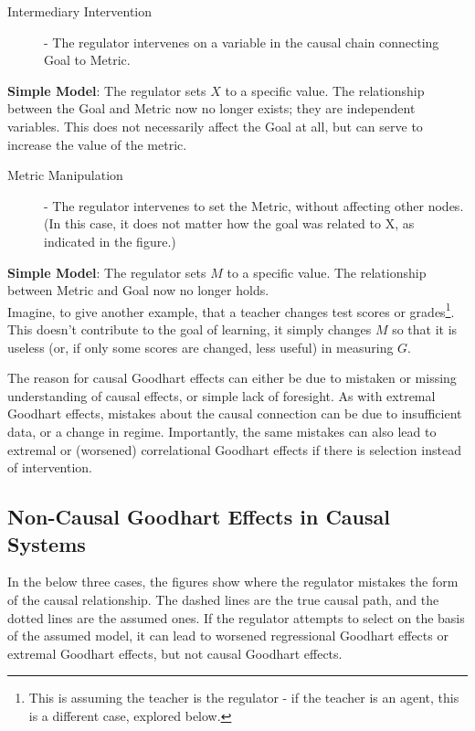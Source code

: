 \documentclass[10pt]{article}
\begin{document}
\begin{description}
\item[Intermediary Intervention] - The regulator intervenes on a variable in the causal chain connecting Goal to Metric.
\end{description}
\textbf{Simple Model}:  The regulator sets $X$ to a specific value. The relationship between the Goal and Metric now no longer exists; they are independent variables. This does not necessarily affect the Goal at all, but can serve to increase the value of the metric. 

\begin{description}
\item[Metric Manipulation] - The regulator intervenes to set the Metric, without affecting other nodes. (In this case, it does not matter how the goal was related to X, as indicated in the figure.)
\end{description}
\textbf{Simple Model}:  The regulator sets $M$ to a specific value. The relationship between Metric and Goal now no longer holds.\\

Imagine, to give another example, that a teacher changes test scores or grades\footnote{This is assuming the teacher is the regulator - if the teacher is an agent, this is a different case, explored below.}. This doesn't contribute to the goal of learning, it simply changes $M$ so that it is useless (or, if only some scores are changed, less useful) in measuring $G$. 

The reason for causal Goodhart effects can either be due to mistaken or missing understanding of causal effects, or simple lack of foresight. As with extremal Goodhart effects, mistakes about the causal connection can be due to insufficient data, or a change in regime. Importantly, the same mistakes can also lead to extremal or (worsened) correlational Goodhart effects if there is selection instead of intervention. 

\subsection*{Non-Causal Goodhart Effects in Causal Systems}

In the below three cases, the figures show where the regulator mistakes the form of the causal relationship. The dashed lines are the true causal path, and the dotted lines are the assumed ones. If the regulator attempts to select on the basis of the assumed model, it can lead to worsened regressional Goodhart effects or extremal Goodhart effects, but not causal Goodhart effects. 
\end{document}
